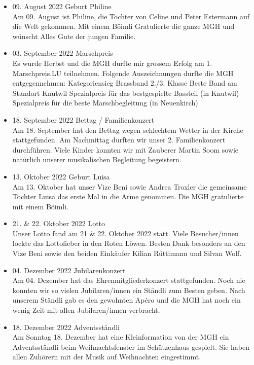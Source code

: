 \begin{history}
\begin{itemize}
        \item 09. August 2022 Geburt Philine\\
              Am 09. August ist Philine, die Tochter von Celine und Peter Estermann auf die Welt
              gekommen.
              Mit einem Böimli Gratulierte die ganze MGH und wünscht Alles Gute der jungen Familie.

        \item 03. September 2022 Marschpreis\\
              Es wurde Herbst und die MGH durfte mir grossem Erfolg am 1. Marschpreis.LU teilnehmen.
              Folgende Auszeichnungen durfte die MGH entgegennehmen:
              Kategoriensieg Brassband 2./3. Klasse
              Beste Band am Standort Knutwil
              Spezialpreis für das bestgespielte Bassteil (in Knutwil)
              Spezialpreis für die beste Marschbegleitung (in Neuenkirch)

        \item 18. September 2022 Bettag / Familienkonzert\\
              Am 18. September hat den Bettag wegen schlechtem Wetter in der Kirche stattgefunden.
              Am Nachmittag durften wir unser 2. Familienkonzert durchführen. Viele Kinder konnten wir
              mit Zauberer Martin Soom sowie natürlich unserer musikalischen Begleitung begeistern.

        \item 13. Oktober 2022 Geburt Luisa\\
              Am 13. Oktober hat unser Vize Beni sowie Andrea Troxler die gemeinsame Tochter Luisa
              das erste Mal in die Arme genommen.
              Die MGH gratulierte mit einem Böimli.

        \item 21. & 22. Oktober 2022 Lotto\\
              Unser Lotto fand am 21 & 22. Oktober 2022 statt. Viele Besucher/innen lockte das
              Lottofieber in den Roten Löwen.
              Besten Dank besonders an den Vize Beni sowie den beiden Einkäufer Kilian Rüttimann und
              Silvan Wolf.

        \item 04. Dezember 2022 Jubilarenkonzert\\
              Am 04. Dezember hat das Ehrenmitgliederkonzert stattgefunden. Noch nie konnten wir so
              vielen Jubilaren/innen ein Ständli zum Besten geben.
              Nach unserem Ständli gab es den gewohnten Apéro und die MGH hat noch ein wenig Zeit
              mit allen Jubilaren/innen verbracht.

        \item 18. Dezember 2022 Adventsständli\\
              Am Sonntag 18. Dezember hat eine Kleinformation von der MGH ein Adventsständli beim
              Weihnachtsfenster im Schützenhaus gespielt. Sie haben allen Zuhörern mit der Musik auf
              Weihnachten eingestimmt.


    \end{itemize}

\end{history}
